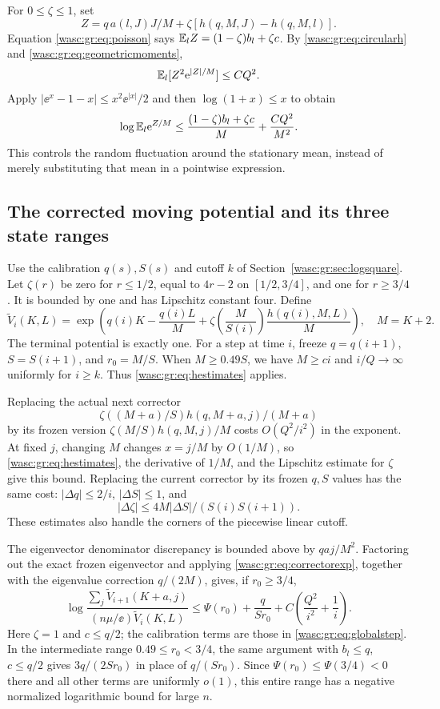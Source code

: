 \documentclass[11pt,a4paper]{article}
\theoremstyle{remark}\newtheorem{remark}[theorem]{Remark}
\numberwithin{equation}{section}
\begin{document}
For $0\le\zeta\le1$, set
\[
Z=q\,a(l,J)J/M+\zeta[h(q,M,J)-h(q,M,l)].
\]
Equation \eqref{wasc:gr:eq:poisson} says $\mathbb E_l Z=(1-\zeta)b_l+\zeta c$. By \eqref{wasc:gr:eq:circularh} and \eqref{wasc:gr:eq:geometricmoments},
\[
\mathbb E_l[Z^2\mathrm e^{|Z|/M}]\le C Q^2.
\]
Apply $|\ee^x-1-x|\le x^2\ee^{|x|}/2$ and then $\log(1+x)\le x$ to obtain
\begin{equation}\label{wasc:gr:eq:correctorexp}
\log\mathbb E_l\mathrm e^{Z/M}\le\frac{(1-\zeta)b_l+\zeta c}{M}
+\frac{C Q^2}{M^2}.
\end{equation}
This controls the random fluctuation around the stationary mean, instead of merely substituting that mean in a pointwise expression.

\subsection{The corrected moving potential and its three state ranges}
Use the calibration $q(s),S(s)$ and cutoff $k$ of Section~\ref{wasc:gr:sec:logsquare}. Let $\zeta(r)$ be zero for $r\le1/2$, equal to $4r-2$ on $[1/2,3/4]$, and one for $r\ge3/4$. It is bounded by one and has Lipschitz constant four. Define
\begin{equation}\label{wasc:gr:eq:correctedpotential}
\widetilde V_i(K,L)=\exp\!\left(q(i)K-\frac{q(i)L}{M}
+\zeta\!\left(\frac{M}{S(i)}\right)\frac{h(q(i),M,L)}M\right),
\quad M=K+2.
\end{equation}
The terminal potential is exactly one. For a step at time $i$, freeze $q=q(i+1)$, $S=S(i+1)$, and $r_0=M/S$. When $M\ge0.49S$, we have $M\ge c i$ and $i/Q\to\infty$ uniformly for $i\ge k$. Thus \eqref{wasc:gr:eq:hestimates} applies.

Replacing the actual next corrector
\[
\zeta((M+a)/S)h(q,M+a,j)/(M+a)
\]
by its frozen version $\zeta(M/S)h(q,M,j)/M$ costs $O(Q^2/i^2)$ in the exponent. At fixed $j$, changing $M$ changes $x=j/M$ by $O(1/M)$, so \eqref{wasc:gr:eq:hestimates}, the derivative of $1/M$, and the Lipschitz estimate for $\zeta$ give this bound. Replacing the current corrector by its frozen $q,S$ values has the same cost: $|\Delta q|\le2/i$, $|\Delta S|\le1$, and
\[
|\Delta\zeta|\le4M|\Delta S|/(S(i)S(i+1)).
\]
These estimates also handle the corners of the piecewise linear cutoff.

The eigenvector denominator discrepancy is bounded above by $qaj/M^2$. Factoring out the exact frozen eigenvector and applying \eqref{wasc:gr:eq:correctorexp}, together with the eigenvalue correction $q/(2M)$, gives, if $r_0\ge3/4$,
\begin{equation}\label{wasc:gr:eq:correctedstep}
\log\frac{\sum_j\widetilde V_{i+1}(K+a,j)}{(n\mu/\ee)\widetilde V_i(K,L)}
\le\Psi(r_0)+\frac{q}{Sr_0}
+C\left(\frac{Q^2}{i^2}+\frac1i\right).
\end{equation}
Here $\zeta=1$ and $c\le q/2$; the calibration terms are those in \eqref{wasc:gr:eq:globalstep}. In the intermediate range $0.49\le r_0<3/4$, the same argument with $b_l\le q$, $c\le q/2$ gives $3q/(2Sr_0)$ in place of $q/(Sr_0)$. Since $\Psi(r_0)\le\Psi(3/4)<0$ there and all other terms are uniformly $o(1)$, this entire range has a negative normalized logarithmic bound for large $n$.
\end{document}
